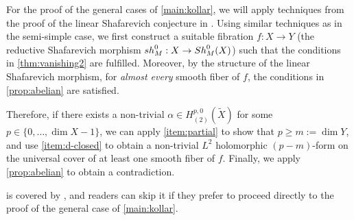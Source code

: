 \documentclass[11pt,a4paper,english]{smfart}
\theoremstyle{plain}
\theoremstyle{definition}
\theoremstyle{plain}
\newcommand\sM{{\mathcal M}}
\def\bR{\mathbb{R}}
\def\cM{{\mathscr{M}}}
\def\cD{\mathscr{D}}
\begin{document}
	
 For the proof of the general cases of \cref{main:kollar}, we will apply techniques from the proof of the linear Shafarevich conjecture in \cite{EKPR12}.   
 Using similar techniques as in the semi-simple case,   we first  construct a suitable fibration $f:X\to Y$ (the reductive Shafarevich morphism ${\rm sh}_M^0:X\to {\rm Sh}_M^0(X)$)  such that the conditions in \cref{thm:vanishing2} are fulfilled. Moreover, by the structure of the linear Shafarevich morphism, for  \emph{almost every}  smooth fiber  of $f$, the conditions in \cref{prop:abelian} are satisfied.  
 
 Therefore, if there exists a non-trivial $\alpha\in H^{p,0}_{(2)}(\widetilde{X})$ for some $p\in \{0,\ldots,\dim X-1\}$,  we can  apply \cref{item:partial}  to show that $p\geq m:=\dim Y$, and use \cref{item:d-closed} to obtain a non-trivial $L^2$ holomorphic $(p-m)$-form on the universal cover of  at least one  smooth fiber  of $f$. Finally, we apply \cref{prop:abelian} to obtain a contradiction.  %
	
 	 is covered by , and readers can skip it if they prefer to proceed directly to the proof of the general case of \cref{main:kollar}. 
\end{document}
